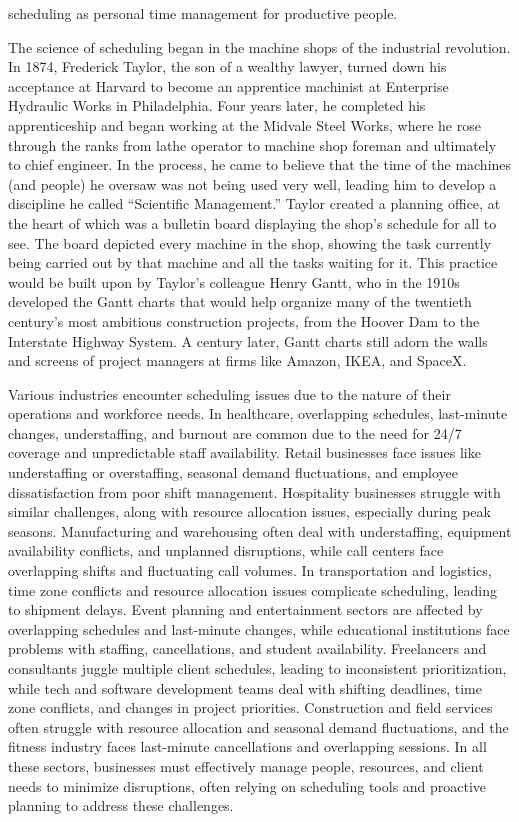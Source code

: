 scheduling as personal time management for productive people.

The science of scheduling began in the machine shops of the industrial revolution. In 1874, Frederick Taylor, the son of a wealthy lawyer, turned down his acceptance at Harvard to become an apprentice machinist at Enterprise Hydraulic Works in Philadelphia. Four years later, he completed his apprenticeship and began working at the Midvale Steel Works, where he rose through the ranks from lathe operator to machine shop foreman and ultimately to chief engineer. In the process, he came to believe that the time of the machines (and people) he oversaw was not being used very well, leading him to develop a discipline he called “Scientific Management.”
Taylor created a planning office, at the heart of which was a bulletin board displaying the shop’s schedule for all to see. The board depicted every machine in the shop, showing the task currently being carried out by that machine and all the tasks waiting for it. This practice would be built upon by Taylor’s colleague Henry Gantt, who in the 1910s developed the Gantt charts that would help organize many of the twentieth century’s most ambitious construction projects, from the Hoover Dam to the Interstate Highway System. A century later, Gantt charts still adorn the walls and screens of project managers at firms like Amazon, IKEA, and SpaceX.

Various industries encounter scheduling issues due to the nature of their operations and workforce needs. In healthcare, overlapping schedules, last-minute changes, understaffing, and burnout are common due to the need for 24/7 coverage and unpredictable staff availability. Retail businesses face issues like understaffing or overstaffing, seasonal demand fluctuations, and employee dissatisfaction from poor shift management. Hospitality businesses struggle with similar challenges, along with resource allocation issues, especially during peak seasons. Manufacturing and warehousing often deal with understaffing, equipment availability conflicts, and unplanned disruptions, while call centers face overlapping shifts and fluctuating call volumes. In transportation and logistics, time zone conflicts and resource allocation issues complicate scheduling, leading to shipment delays. Event planning and entertainment sectors are affected by overlapping schedules and last-minute changes, while educational institutions face problems with staffing, cancellations, and student availability. Freelancers and consultants juggle multiple client schedules, leading to inconsistent prioritization, while tech and software development teams deal with shifting deadlines, time zone conflicts, and changes in project priorities. Construction and field services often struggle with resource allocation and seasonal demand fluctuations, and the fitness industry faces last-minute cancellations and overlapping sessions. In all these sectors, businesses must effectively manage people, resources, and client needs to minimize disruptions, often relying on scheduling tools and proactive planning to address these challenges.

